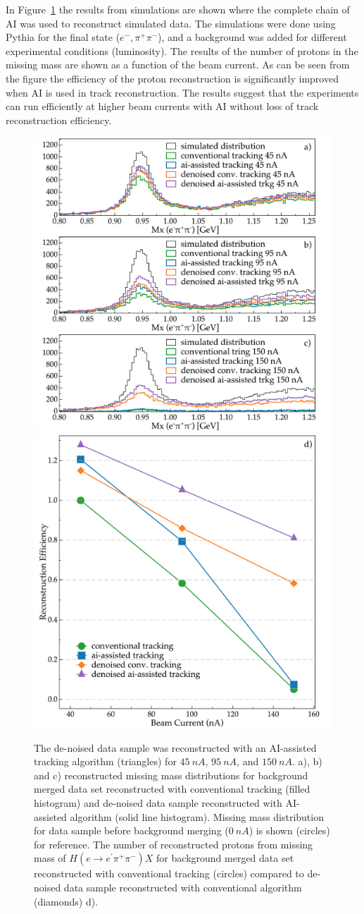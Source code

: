 \documentclass{webofc}
\begin{document}
In Figure~\ref{physics::conv_dn_ai} the results from simulations are shown where the complete chain of AI was used 
to reconstruct simulated data. The simulations were done using Pythia for the final state ($e^-,\pi^+\pi^-$), and a background 
was added for different experimental conditions (luminosity). The results of the number of protons in the missing mass are shown
as a function of the beam current. As can be seen from the figure the efficiency of the proton reconstruction is significantly improved
when AI is used in track reconstruction. The results suggest that the experiments can run efficiently at higher beam currents with
AI without loss of track reconstruction efficiency.

\begin{figure}[!h]
\begin{center}
 \includegraphics[height=2.in]{images/missing_mass.pdf}
 \includegraphics[height=2.in]{images/luminosity_scan.pdf}
\caption { 
The de-noised data sample was reconstructed with an AI-assisted tracking 
algorithm (triangles)  for $45~nA$, $95~nA$, and $150~nA$. a), b) and c) reconstructed missing mass distributions for 
background merged data set reconstructed with conventional tracking (filled histogram) and de-noised data sample 
reconstructed with AI-assisted algorithm (solid line histogram). Missing mass distribution for data sample before 
background merging ($0~nA$) is shown (circles) for reference.
The number of reconstructed protons from missing mass of $H(e \rightarrow e^\prime \pi^+ \pi^-) X$ 
for background merged data set reconstructed with conventional tracking (circles) compared to de-noised data sample 
reconstructed with conventional algorithm (diamonds) d). }
 \label{physics::conv_dn_ai}
 \end{center}
\end{figure}
\end{document}
